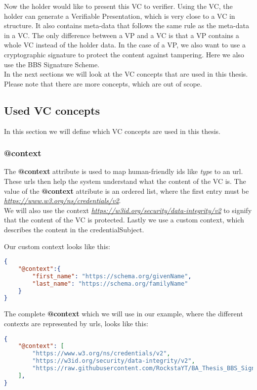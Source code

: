 \documentclass[
	a4paper               %
	,bibliography=totoc   %
	,listof=totoc         %
	,monolingual
]{bfhthesis}              %
\begin{document}
Now the holder would like to present this VC to verifier.
Using the VC, the holder can generate a Verifiable Presentation\cite{verifiable-credentials}, which is very close to a VC in structure.
It also contains meta-data that follows the same rule as the meta-data in a VC.
The only difference between a VP and a VC is that a VP contains a whole VC instead of the holder data.
In the case of a VP, we also want to use a cryptographic signature to protect the content against tampering. Here we also use the BBS Signature Scheme.\\

In the next sections we will look at the VC concepts that are used in this thesis.
Please note that there are more concepts, which are out of scope.

\subsection{Used VC concepts}
In this section we will define which VC concepts are used in this thesis.

\subsubsection{@context}
The \textbf{@context} attribute is used to map human-friendly ids like \textit{type} to an url.
These urls then help the system understand what the content of the VC is.
The value of the \textbf{@context} attribute is an ordered list, where the first entry must be \textit{\url{https://www.w3.org/ns/credentials/v2}}.\\
We will also use the context \textit{\url{https://w3id.org/security/data-integrity/v2}} to signify that the content of the VC is protected.
Lastly we use a custom context, which describes the content in the credentialSubject.\newpage

Our custom context looks like this:
\begin{lstlisting}[language=json,firstnumber=1,caption={Example custom context},captionpos=b]
{
    "@context":{
        "first_name": "https://schema.org/givenName",
        "last_name": "https://schema.org/familyName"
    }
}
\end{lstlisting}

The complete \textbf{@context} which we will use in our example, where the different contexts are represented by urls, looks like this:
\begin{lstlisting}[language=json,firstnumber=1,caption={Example context},captionpos=b]
{
	"@context": [
		"https://www.w3.org/ns/credentials/v2",
		"https://w3id.org/security/data-integrity/v2",
		"https://raw.githubusercontent.com/RockstaYT/BA_Thesis_BBS_Signatures/docs/context/example_1.jsonld"
	],
}
\end{lstlisting}
\end{document}
